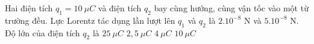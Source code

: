 \begin{vidu} %
	Hai điện tích $q_1 = 10\ \mu C$ và điện tích $q_2$ bay cùng hướng, cùng vận tốc vào một từ trường đều. Lực Lorentz tác dụng lần lượt lên $q_1$ và $q_2$ là $2.10^{-8}$ N và $5.10^{-8}$ N. Độ lớn của điện tích $q_2$ là
	\choice
	{\True $25\ \mu C$}
	{$2,5\ \mu C$}
	{$4\ \mu C$}
	{$10\ \mu C$}
\end{vidu}
